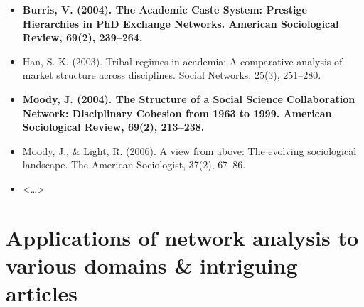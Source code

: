 \documentclass[
]{book}
\begin{document}
\begin{itemize}
\item
  \textbf{Burris, V. (2004). The Academic Caste System: Prestige Hierarchies in PhD Exchange Networks. American Sociological Review, 69(2), 239--264.}
\item
  Han, S.-K. (2003). Tribal regimes in academia: A comparative analysis of market structure across disciplines. Social Networks, 25(3), 251--280.
\item
  \textbf{Moody, J. (2004). The Structure of a Social Science Collaboration Network: Disciplinary Cohesion from 1963 to 1999. American Sociological Review, 69(2), 213--238.}
\item
  Moody, J., \& Light, R. (2006). A view from above: The evolving sociological landscape. The American Sociologist, 37(2), 67--86.
\item
  \textless\ldots\textgreater{}
\end{itemize}

\section*{\texorpdfstring{\textbf{Applications of network analysis to various domains \& intriguing articles}}{Applications of network analysis to various domains \& intriguing articles}}\label{applications-of-network-analysis-to-various-domains-intriguing-articles}
\end{document}
